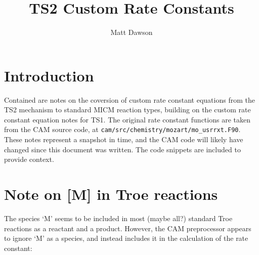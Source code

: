 \documentclass[titlepage]{article}
\begin{document}
\title{TS2 Custom Rate Constants}
\author{Matt Dawson}
\maketitle


\section{Introduction}

Contained are notes on the coversion of custom rate constant equations
from the TS2 mechanism to standard MICM reaction types, building on
the custom rate constant equation notes for TS1. The original
rate constant functions are taken from the CAM source code, at 
\verb>cam/src/chemistry/mozart/mo_usrrxt.F90>. These notes represent
a snapshot in time, and the CAM code will likely have changed since this
document was written. The code snippets are included to provide context. 



\section{Note on [M] in Troe reactions}


The species `M' seems to be included in most (maybe all?) standard Troe reactions as a reactant and a product.
However, the CAM preprocessor appears to ignore `M' as a species, and instead includes it in the calculation of the
rate constant:
\end{document}
